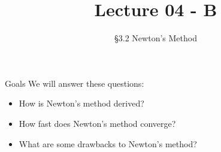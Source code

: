 \documentclass[10pt]{beamer}
\title[Math/CS 375]{Lecture 04 - B}
\subtitle{\S 3.2  Newton’s Method}
\begin{document}
\begin{frame}
  \titlepage
\end{frame}
\begin{frame}{Goals}
We will answer these questions:\\[3mm]
\begin{itemize}
    \item How is Newton's method derived? 
    \item How fast does Newton's method converge?
    \item What are some drawbacks to Newton's method?
\end{itemize}
\end{frame}
\end{document}
